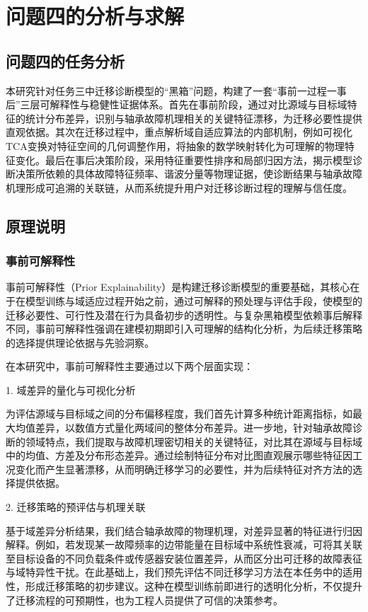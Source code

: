\documentclass[a4paper]{CPIPC}
\numberwithin{equation}{section}
\begin{document}
\newpage
\section{问题四的分析与求解}
\subsection{问题四的任务分析}

本研究针对任务三中迁移诊断模型的“黑箱”问题，构建了一套“事前一过程一事后”三层可解释性与稳健性证据体系。首先在事前阶段，通过对比源域与目标域特征的统计分布差异，识别与轴承故障机理相关的关键特征漂移，为迁移必要性提供直观依据。其次在迁移过程中，重点解析域自适应算法的内部机制，例如可视化TCA变换对特征空间的几何调整作用，将抽象的数学映射转化为可理解的物理特征变化。最后在事后决策阶段，采用特征重要性排序和局部归因方法，揭示模型诊断决策所依赖的具体故障特征频率、谐波分量等物理证据，使诊断结果与轴承故障机理形成可追溯的关联链，从而系统提升用户对迁移诊断过程的理解与信任度\cite{ref9}。

\subsection{原理说明}
\subsubsection{事前可解释性}
事前可解释性（Prior Explainability）是构建迁移诊断模型的重要基础，其核心在于在模型训练与域适应过程开始之前，通过可解释的预处理与评估手段，使模型的迁移必要性、可行性及潜在行为具备初步的透明性。与复杂黑箱模型依赖事后解释不同，事前可解释性强调在建模初期即引入可理解的结构化分析，为后续迁移策略的选择提供理论依据与先验洞察。

在本研究中，事前可解释性主要通过以下两个层面实现：

1. 域差异的量化与可视化分析

为评估源域与目标域之间的分布偏移程度，我们首先计算多种统计距离指标，如最大均值差异，以数值方式量化两域间的整体分布差异。进一步地，针对轴承故障诊断的领域特点，我们提取与故障机理密切相关的关键特征，对比其在源域与目标域中的均值、方差及分布形态差异。通过绘制特征分布对比图直观展示哪些特征因工况变化而产生显著漂移，从而明确迁移学习的必要性，并为后续特征对齐方法的选择提供依据。

2. 迁移策略的预评估与机理关联

基于域差异分析结果，我们结合轴承故障的物理机理，对差异显著的特征进行归因解释。例如，若发现某一故障频率的边带能量在目标域中系统性衰减，可将其关联至目标设备的不同负载条件或传感器安装位置差异，从而区分出可迁移的故障表征与域特异性干扰。在此基础上，我们预先评估不同迁移学习方法在本任务中的适用性，形成迁移策略的初步建议。这种在模型训练前即进行的透明化分析，不仅提升了迁移流程的可预期性，也为工程人员提供了可信的决策参考。
\end{document}
